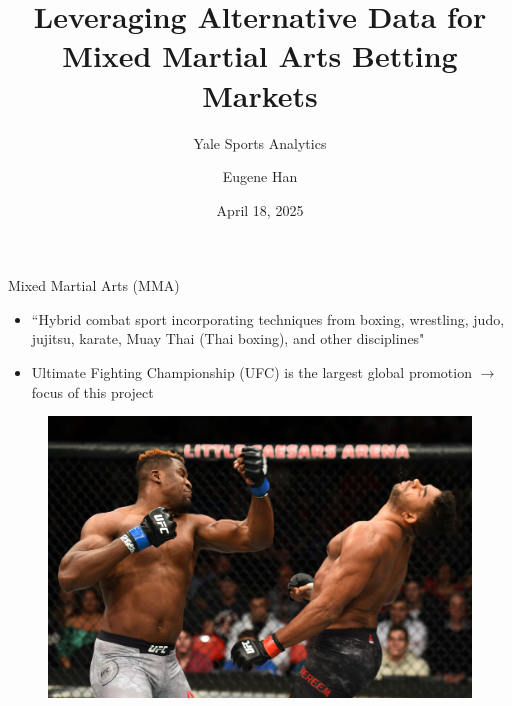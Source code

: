 \documentclass[aspectratio=169,xcolor=dvipsnames]{beamer}
\title{Leveraging Alternative Data for Mixed Martial Arts Betting Markets}
\subtitle{Yale Sports Analytics}
\author{Eugene Han}
\institute
{
    Department of Statistics \& Data Science \\
    Yale University %
}
\date{April 18, 2025} %
\begin{document}
\begin{frame}
    \titlepage
\end{frame}


\begin{frame}{Mixed Martial Arts (MMA)}
    \begin{itemize}
        \item ``Hybrid combat sport incorporating techniques from boxing, wrestling, judo, jujitsu, karate, Muay Thai (Thai boxing), and other disciplines"

        \item Ultimate Fighting Championship (UFC) is the largest global promotion $\rightarrow$ focus of this project
    \end{itemize}
    \begin{figure}
        \centering
        \includegraphics[width=0.5\linewidth]{figures/mma_ko.png}
    \end{figure}
\end{frame}

\end{document}
